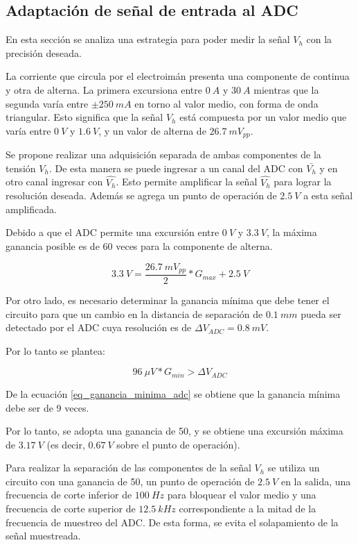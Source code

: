 \subsection{Adaptación de señal de entrada al ADC}\label{sec_adaptacion_señal_vh_ADC}

En esta sección se analiza una estrategia para poder medir la señal $V_h$ con la precisión deseada.

La corriente que circula por el electroimán presenta una componente de continua y otra de alterna. La primera excursiona entre $0\:A$ y $30\:A$ mientras que la segunda varía entre $\pm 250\:mA$ en torno al valor medio, con forma de onda triangular. Esto significa que la señal $V_h$ está compuesta por un valor medio que varía entre $0\:V$ y $1.6\:V$, y un valor de alterna de $26.7\:mV_{pp}$.

Se propone realizar una adquisición separada de ambas componentes de la tensión $V_h$. De esta manera se puede ingresar a un canal del ADC con $\bar{V_h}$ y en otro canal ingresar con $\hat{V_h}$. Esto permite amplificar la señal $\hat{V_h}$ para lograr la resolución deseada. Además se agrega un punto de operación de $2.5\:V$ a esta señal amplificada.

Debido a que el ADC permite una excursión entre $0\:V$ y $3.3\:V$, la máxima ganancia posible es de 60 veces para la componente de alterna.

\begin{equation*}
	3.3 \:V = \frac{26.7\:mV_{pp}}{2}*G_{max}+2.5\:V
\end{equation*}

Por otro lado, es necesario determinar la ganancia mínima que debe tener el circuito para que un cambio en la distancia de separación de $0.1\:mm$ pueda ser detectado por el ADC cuya resolución es de $\Delta V_{ADC}=0.8\:mV$.

Por lo tanto se plantea:

\begin{equation}\label{eq_ganancia_minima_adc}
	 96\:\mu V * G_{min} > \Delta V_{ADC} 
\end{equation}

De la ecuación \ref{eq_ganancia_minima_adc} se obtiene que la ganancia mínima debe ser de 9 veces.

Por lo tanto, se adopta una ganancia de 50, y se obtiene una excursión máxima de $3.17\:V$ (es decir, $0.67\:V$ sobre el punto de operación).

Para realizar la separación de las componentes de la señal $V_h$ se utiliza un circuito con una ganancia de 50, un punto de operación de $2.5\:V$ en la salida, una frecuencia de corte inferior de $100\:Hz$ para bloquear el valor medio y una frecuencia de corte superior de $12.5\:kHz$ correspondiente a la mitad de la frecuencia de muestreo del ADC. De esta forma, se evita el solapamiento de la señal muestreada.

